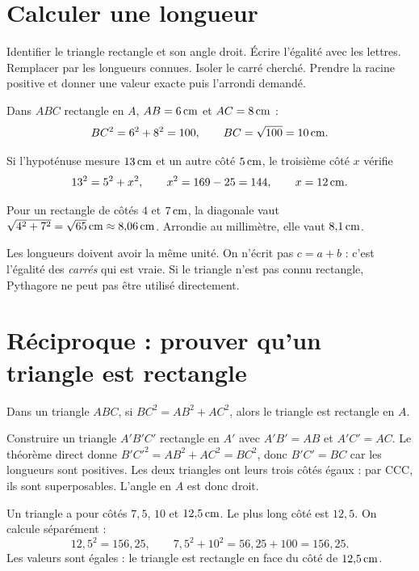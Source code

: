 \documentclass[../cours_3e.tex]{subfiles}
\begin{document}
\section{Calculer une longueur}
\begin{methode}
Identifier le triangle rectangle et son angle droit. Écrire l'égalité avec les lettres. Remplacer par les longueurs connues. Isoler le carré cherché. Prendre la racine positive et donner une valeur exacte puis l'arrondi demandé.
\end{methode}
\begin{exemple}
Dans $ABC$ rectangle en $A$, $AB=6\,\mathrm{cm}$ et $AC=8\,\mathrm{cm}$ :
\[BC^2=6^2+8^2=100,\qquad BC=\sqrt{100}=10\,\mathrm{cm}.\]
\end{exemple}
\begin{exemple}
Si l'hypoténuse mesure $13\,\mathrm{cm}$ et un autre côté $5\,\mathrm{cm}$, le troisième côté $x$ vérifie
\[13^2=5^2+x^2,\qquad x^2=169-25=144,\qquad x=12\,\mathrm{cm}.\]
\end{exemple}
\begin{exemple}
Pour un rectangle de côtés $4$ et $7\,\mathrm{cm}$, la diagonale vaut $\sqrt{4^2+7^2}=\sqrt{65}\,\mathrm{cm}\approx8{,}06\,\mathrm{cm}$. Arrondie au millimètre, elle vaut $8{,}1\,\mathrm{cm}$.
\end{exemple}
\begin{attention}
Les longueurs doivent avoir la même unité. On n'écrit pas $c=a+b$ : c'est l'égalité des \emph{carrés} qui est vraie. Si le triangle n'est pas connu rectangle, Pythagore ne peut pas être utilisé directement.
\end{attention}
\section{Réciproque : prouver qu'un triangle est rectangle}
\begin{theoreme}
Dans un triangle $ABC$, si $BC^2=AB^2+AC^2$, alors le triangle est rectangle en $A$.
\end{theoreme}
\begin{demonstration}
Construire un triangle $A'B'C'$ rectangle en $A'$ avec $A'B'=AB$ et $A'C'=AC$. Le théorème direct donne $B'C'^2=AB^2+AC^2=BC^2$, donc $B'C'=BC$ car les longueurs sont positives. Les deux triangles ont leurs trois côtés égaux : par CCC, ils sont superposables. L'angle en $A$ est donc droit.
\end{demonstration}
\begin{exemple}
Un triangle a pour côtés $7{,}5$, $10$ et $12{,}5\,\mathrm{cm}$. Le plus long côté est $12{,}5$. On calcule séparément :
\[12{,}5^2=156{,}25,\qquad7{,}5^2+10^2=56{,}25+100=156{,}25.\]
Les valeurs sont égales : le triangle est rectangle en face du côté de $12{,}5\,\mathrm{cm}$.
\end{exemple}
\end{document}
